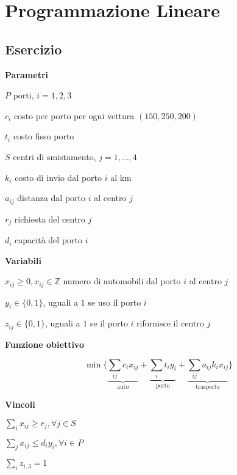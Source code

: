 \documentclass[10pt,a4paper,twoside,openright]{book}
\newcounter{es}
\newcommand{\Es}{
	\stepcounter{es}
	\section{Esercizio \arabic{es}}
	}
\newcommand{\Par}{\textbf{Parametri}}
\newcommand{\Var}{\textbf{Variabili}}
\newcommand{\Fob}{\textbf{Funzione obiettivo}}
\newcommand{\Vin}{\textbf{Vincoli}}
\begin{document}

\AtEndDocument{\cleardoublepage}


\mainmatter
\pagestyle{fancy} %


\chapter{Programmazione Lineare}

\Es

\Par

$P$ porti, $i=1,2,3$

$c_{i}$ costo per porto per ogni vettura $( 150,250,200)$

$t_{i}$ costo fisso porto

$S$ centri di smistamento, $j=1,\dotsc ,4$

$k_{i}$ costo di invio dal porto $i$ al km

$a_{ij}$ distanza dal porto $i$ al centro $j$

$r_{j}$ richiesta del centro $j$

$d_{i}$ capacità del porto $i$

\Var

$x_{ij} \geq 0,x_{ij} \in \mathbb{Z}$ numero di automobili dal porto $i$ al centro $j$

$y_{i} \in \{0,1\}$, uguali a $1$ se uso il porto $i$

$z_{ij} \in \{0,1\}$, uguali a $1$ se il porto $i$ rifornisce il centro $j$

\Fob

\begin{equation*}
	\min\bigg\{\underbrace{\sum _{ij} c_{i} x_{ij}}_{\text{auto}} +\underbrace{\sum _{i} t_{i} y_{i}}_{\text{porto}} +\underbrace{\sum _{ij} a_{ij} k_{i} x_{ij}}_{\text{trasporto}}\bigg\}
\end{equation*}

\Vin

$\sum _{i} x_{ij} \geq r_{j} ,\forall j\in S$

$\sum _{j} x_{ij} \leq d_{i} y_{i} ,\forall i\in P$

$\sum _{i} z_{i,3} =1$
\end{document}
